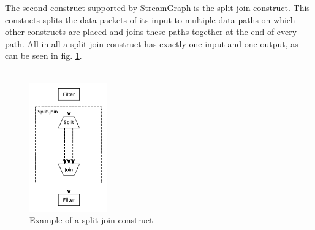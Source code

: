 \documentclass[journal]{IEEEtran}
\begin{document}
\noindent The second construct supported by StreamGraph is the split-join construct. 
This constucts splits the data packets of its input to multiple data paths on which
other constructs are placed and joins these paths together at the end of every
path. All in all a split-join construct has exactly one input and one output, as can 
be seen in fig. \ref{fig_Split_Join}.\\
\\

\begin{figure}[h]
	\centering
	\includegraphics[width=0.3\textwidth]{SplitJoinGraphic}
	\caption{Example of a split-join construct}
	\label{fig_Split_Join}
\end{figure}
\end{document}
